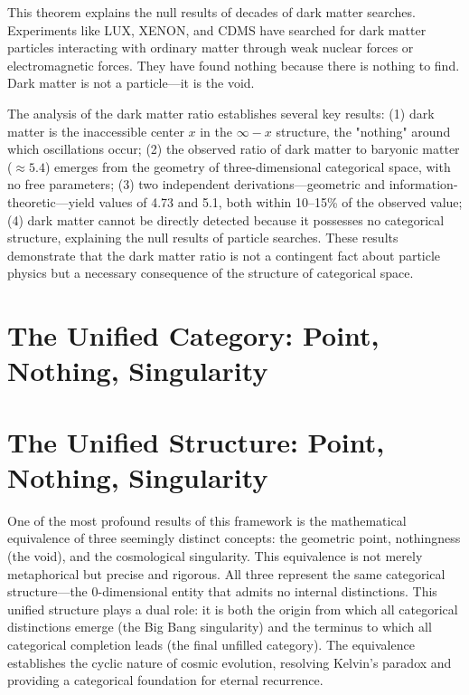 \documentclass[12pt,a4paper]{article}
\theoremstyle{definition}
\theoremstyle{remark}
\begin{document}
This theorem explains the null results of decades of dark matter searches. Experiments like LUX, XENON, and CDMS have searched for dark matter particles interacting with ordinary matter through weak nuclear forces or electromagnetic forces. They have found nothing because there is nothing to find. Dark matter is not a particle—it is the void.



The analysis of the dark matter ratio establishes several key results: (1) dark matter is the inaccessible center $x$ in the $\infty - x$ structure, the "nothing" around which oscillations occur; (2) the observed ratio of dark matter to baryonic matter ($\approx 5.4$) emerges from the geometry of three-dimensional categorical space, with no free parameters; (3) two independent derivations—geometric and information-theoretic—yield values of 4.73 and 5.1, both within 10–15\% of the observed value; (4) dark matter cannot be directly detected because it possesses no categorical structure, explaining the null results of particle searches. These results demonstrate that the dark matter ratio is not a contingent fact about particle physics but a necessary consequence of the structure of categorical space.



\section{The Unified Category: Point, Nothing, Singularity}
\label{sec:unified}
\section{The Unified Structure: Point, Nothing, Singularity}
\label{sec:unified}

One of the most profound results of this framework is the mathematical equivalence of three seemingly distinct concepts: the geometric point, nothingness (the void), and the cosmological singularity. This equivalence is not merely metaphorical but precise and rigorous. All three represent the same categorical structure—the 0-dimensional entity that admits no internal distinctions. This unified structure plays a dual role: it is both the origin from which all categorical distinctions emerge (the Big Bang singularity) and the terminus to which all categorical completion leads (the final unfilled category). The equivalence establishes the cyclic nature of cosmic evolution, resolving Kelvin's paradox and providing a categorical foundation for eternal recurrence.
\end{document}
